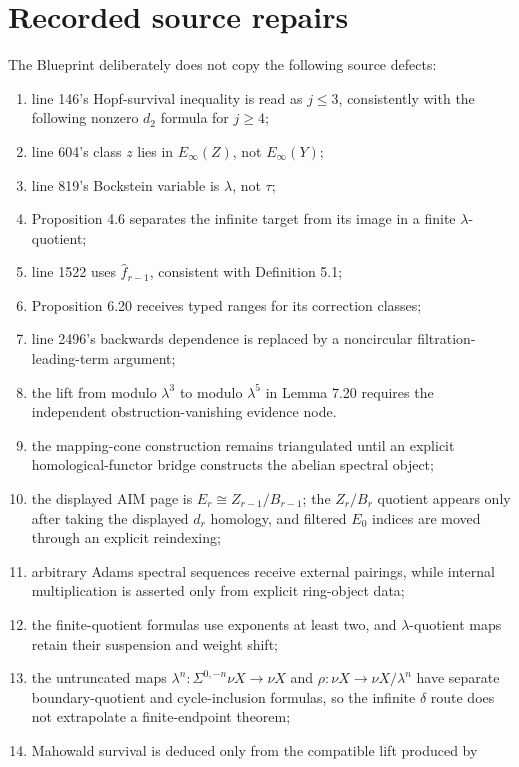\section{Recorded source repairs}

The Blueprint deliberately does not copy the following source defects:
\begin{enumerate}
  \item line 146's Hopf-survival inequality is read as $j\le3$, consistently
    with the following nonzero $d_2$ formula for $j\ge4$;
  \item line 604's class $z$ lies in $E_\infty(Z)$, not $E_\infty(Y)$;
  \item line 819's Bockstein variable is $\lambda$, not $\tau$;
  \item Proposition 4.6 separates the infinite target from its image in a
    finite $\lambda$-quotient;
  \item line 1522 uses $\widehat f_{r-1}$, consistent with Definition 5.1;
  \item Proposition 6.20 receives typed ranges for its correction classes;
  \item line 2496's backwards dependence is replaced by a noncircular
    filtration-leading-term argument;
  \item the lift from modulo $\lambda^3$ to modulo $\lambda^5$ in Lemma 7.20
    requires the independent obstruction-vanishing evidence node.
  \item the mapping-cone construction remains triangulated until an explicit
    homological-functor bridge constructs the abelian spectral object;
  \item the displayed AIM page is
    $E_r\cong Z_{r-1}/B_{r-1}$; the $Z_r/B_r$ quotient appears only after
    taking the displayed $d_r$ homology, and filtered $E_0$ indices are moved
    through an explicit reindexing;
  \item arbitrary Adams spectral sequences receive external pairings, while
    internal multiplication is asserted only from explicit ring-object data;
  \item the finite-quotient formulas use exponents at least two, and
    $\lambda$-quotient maps retain their suspension and weight shift;
  \item the untruncated maps
    $\lambda^n:\Sigma^{0,-n}\nu X\to\nu X$ and
    $\rho:\nu X\to\nu X/\lambda^n$ have separate boundary-quotient and
    cycle-inclusion formulas, so the infinite $\delta$ route does not
    extrapolate a finite-endpoint theorem;
  \item Mahowald survival is deduced only from the compatible lift produced by

\end{enumerate}
